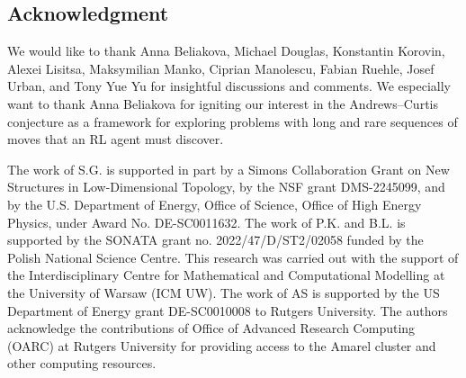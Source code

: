 
\subsection*{Acknowledgment}

We would like to thank Anna Beliakova, Michael Douglas, Konstantin Korovin, Alexei Lisitsa, Maksymilian Manko, Ciprian Manolescu, Fabian Ruehle, Josef Urban, and Tony Yue Yu for insightful discussions and comments. We especially want to thank Anna Beliakova for igniting our interest in the Andrews--Curtis conjecture as a framework for exploring problems with long and rare sequences of moves that an RL agent must discover.

The work of S.G. is supported in part by a Simons Collaboration Grant on New Structures in Low-Dimensional Topology, by the NSF grant DMS-2245099, and by the U.S. Department of Energy, Office of Science, Office of High Energy Physics, under Award No. DE-SC0011632. The work of P.K. and B.L. is supported by the SONATA grant no. 2022/47/D/ST2/02058 funded by the Polish National Science Centre. This research was carried out with the support of the Interdisciplinary Centre for Mathematical and Computational Modelling at the University of Warsaw (ICM UW). The work of AS is supported by the US Department of Energy grant DE-SC0010008 to Rutgers University. The authors acknowledge the contributions of Office of Advanced Research Computing (OARC) at Rutgers University for providing access to the Amarel cluster and other computing resources.